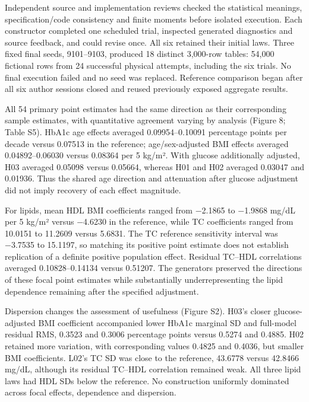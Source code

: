 \documentclass[11pt,letterpaper]{article}
\begin{document}
Independent source and implementation reviews checked the statistical meanings, specification/\allowbreak{}code consistency and finite moments before isolated execution. Each constructor completed one scheduled trial, inspected generated diagnostics and source feedback, and could revise once. All six retained their initial laws. Three fixed final seeds, 9101–\allowbreak{}9103, produced 18 distinct 3,000-row tables: 54,000 fictional rows from 24 successful physical attempts, including the six trials. No final execution failed and no seed was replaced. Reference comparison began after all six author sessions closed and reused previously exposed aggregate results.


All 54 primary point estimates had the same direction as their corresponding sample estimates, with quantitative agreement varying by analysis (Figure 8; Table S5). HbA1c age effects averaged 0.09954–\allowbreak{}0.10091 percentage points per decade versus 0.07513 in the reference; age/\allowbreak{}sex-adjusted BMI effects averaged 0.04892–\allowbreak{}0.06030 versus 0.08364 per 5 kg/\allowbreak{}m². With glucose additionally adjusted, H03 averaged 0.05098 versus 0.05664, whereas H01 and H02 averaged 0.03047 and 0.01936. Thus the shared age direction and attenuation after glucose adjustment did not imply recovery of each effect magnitude.


For lipids, mean HDL BMI coefficients ranged from −2.1865 to −1.9868 mg/\allowbreak{}dL per 5 kg/\allowbreak{}m² versus −4.6230 in the reference, while TC coefficients ranged from 10.0151 to 11.2609 versus 5.6831. The TC reference sensitivity interval was −3.7535 to 15.1197, so matching its positive point estimate does not establish replication of a definite positive population effect. Residual TC–\allowbreak{}HDL correlations averaged 0.10828–\allowbreak{}0.14134 versus 0.51207. The generators preserved the directions of these focal point estimates while substantially underrepresenting the lipid dependence remaining after the specified adjustment.


Dispersion changes the assessment of usefulness (Figure S2). H03's closer glucose-adjusted BMI coefficient accompanied lower HbA1c marginal SD and full-model residual RMS, 0.3523 and 0.3006 percentage points versus 0.5274 and 0.4885. H02 retained more variation, with corresponding values 0.4825 and 0.4036, but smaller BMI coefficients. L02's TC SD was close to the reference, 43.6778 versus 42.8466 mg/\allowbreak{}dL, although its residual TC–\allowbreak{}HDL correlation remained weak. All three lipid laws had HDL SDs below the reference. No construction uniformly dominated across focal effects, dependence and dispersion.
\end{document}
